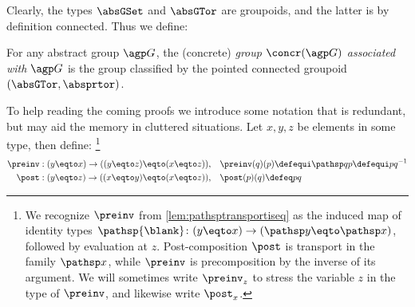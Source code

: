 Clearly, the types $\absGSet$ and $\absGTor$ are groupoids,
and the latter is by definition connected. Thus we define:

\begin{definition}\label{def:concr}
  For any abstract group ${\agp G}$, the (concrete) 
  \emph{group $\concr({\agp G})$ associated with ${\agp G}$} 
  is the group classified by the pointed connected groupoid 
  $(\absGTor,\absprtor)$.
\end{definition}

To help reading the coming proofs we introduce some notation that is
redundant, but may aid the memory in cluttered situations.
Let $x,y,z$ be elements in some type, then define:%
\footnote{We recognize $\preinv$ from \cref{lem:pathsptransportiseq}
as the induced map of identity types $\pathsp{\blank}\colon (y\eqto x)
\to(\pathsp y \eqto \pathsp x)$, followed by evaluation at $z$.
Post-composition $\post$ is transport in the family $\pathsp x$,
while $\preinv$ is precomposition by the inverse of its argument.
We will sometimes write $\preinv_z$ to stress the variable $z$
in the type of $\preinv$, and likewise write $\post_x$.}
\begin{align*}
  \preinv:(y\eqto x)\to ((y\eqto z)\eqto (x\eqto z)),\quad&\preinv(q)(p)\defequi\pathsp qp\defequi pq^{-1}\\
  \post:(y\eqto z)\to ((x\eqto y)\eqto (x\eqto z)),\quad&\post(p)(q)\defeq pq
\end{align*}

